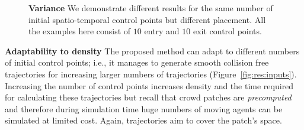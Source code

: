 \begin{figure}[t]
\begin{subfigure}[b]{0.24\linewidth}
 	\caption{}
 \end{subfigure}
 \caption{
 	\textbf{Variance}
 	We demonstrate different results for the same number of initial spatio-temporal control points but different placement.
 	All the examples here consist of $10$ entry and $10$ exit control points.
 }
 \label{fig:res:adapt-cp-placement}
\end{figure}



\textbf{Adaptability to density}
The proposed method can adapt to different numbers of initial control points; i.e., it manages to generate smooth collision free trajectories for increasing larger numbers of trajectories (Figure~\ref{fig:res:inputs}).
Increasing the number of control points increases density and the time required for calculating these trajectories but recall that crowd patches are \emph{precomputed} and therefore during simulation time huge numbers of moving agents can be simulated at limited cost.
Again, trajectories aim to cover the patch's space.



